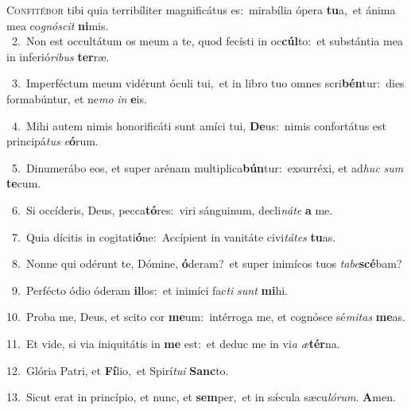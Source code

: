 \lettrine{\initial\textcolor{\initialcolor}{C}}{onfitébor} tibi quia terribíliter magnificátus es:~\dagger mirabília ópera \textbf{tu}\-a,~\star et ánima mea co\-\textit{gnó}\-\textit{scit} \textbf{ni}\-mis.\\
{\numbfont\textcolor{\numbcolor}{~2.}}~Non est occultátum os meum a te, quod fecísti in oc\-\textbf{cúl}\-to:~\star et substántia mea in inferió\-\textit{ri}\-\textit{bus} \textbf{ter}\-ræ.\par
{\numbfont\textcolor{\numbcolor}{~3.}}~Imperféctum meum vidérunt óculi tui,~\dagger et in libro tuo omnes scri\-\textbf{bén}\-tur:~\star dies formabúntur, et ne\textit{mo} \textit{in} \textbf{e}\-is.\par
{\numbfont\textcolor{\numbcolor}{~4.}}~Mihi autem nimis honorificáti sunt amíci tui, \textbf{De}\-us:~\star nimis confortátus est principá\textit{tus} \textit{e}\-\textbf{ó}rum.\par
{\numbfont\textcolor{\numbcolor}{~5.}}~Dinumerábo eos, et super arénam multiplica\-\textbf{bún}\-tur:~\star exsurréxi, et ad\textit{huc} \textit{sum} \textbf{te}\-cum.\par
{\numbfont\textcolor{\numbcolor}{~6.}}~Si occíderis, Deus, pecca\-\textbf{tó}\-res:~\star viri sánguinum, decli\-\textit{ná}\-\textit{te} \textbf{a} me.\par
{\numbfont\textcolor{\numbcolor}{~7.}}~Quia dícitis in cogitati\-\textbf{ó}\-ne:~\star Accípient in vanitáte civi\-\textit{tá}\-\textit{tes} \textbf{tu}\-as.\par
{\numbfont\textcolor{\numbcolor}{~8.}}~Nonne qui odérunt te, Dómine, \textbf{ó}\-deram?~\star et super inimícos tuos \textit{ta}\-\textit{be}\textbf{scé}bam?\par
{\numbfont\textcolor{\numbcolor}{~9.}}~Perfécto ódio óderam \textbf{il}\-los:~\star et inimíci fac\textit{ti} \textit{sunt} \textbf{mi}\-hi.\par
{\numbfont\textcolor{\numbcolor}{10.}}~Proba me, Deus, et scito cor \textbf{me}\-um:~\star intérroga me, et cognósce sé\-\textit{mi}\-\textit{tas} \textbf{me}\-as.\par
{\numbfont\textcolor{\numbcolor}{11.}}~Et vide, si via iniquitátis in \textbf{me} est:~\star et deduc me in vi\textit{a} \textit{æ}\-\textbf{tér}na.\par
{\numbfont\textcolor{\numbcolor}{12.}}~Glória Patri, et \textbf{Fí}\-lio,~\star et Spirí\-\textit{tu}\-\textit{i} \textbf{Sanc}\-to.\par
{\numbfont\textcolor{\numbcolor}{13.}}~Sicut erat in princípio, et nunc, et \textbf{sem}\-per,~\star et in sǽcula sæcu\-\textit{ló}\-\textit{rum}. \textbf{A}\-men.\par
